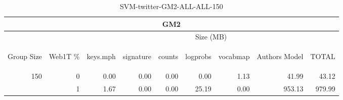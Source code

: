 \begin{center}
\begin{table}[htbp] 
 \begin{center}
\begin{tabular}{ | r | r | r | r | r | r | r | r | r |}
\hline
\multicolumn{9}{|c|}{GM2}\\
\hline
 & & \multicolumn{7}{|c|}{Size (MB)}\\ \cline{3-9}
\begin{sideways}Group Size\end{sideways} & \begin{sideways}Web1T \% \end{sideways} & \begin{sideways}keys.mph\end{sideways} & \begin{sideways}signature\end{sideways} & \begin{sideways}counts\end{sideways} & \begin{sideways}logprobs\end{sideways} & \begin{sideways}vocabmap\end{sideways} & \begin{sideways}Authors Model \end{sideways} & \begin{sideways}TOTAL\end{sideways}\\
\hline
\multirow{1}{*}{150}
 & 0 & 0.00 & 0.00 & 0.00 & 0.00 & 1.13 & 41.99 & 43.12\\ \cline{2-9}
 & 1 & 1.67 & 0.00 & 0.00 & 25.19 & 0.00 & 953.13 & 979.99\\ \cline{2-9}
\hline
\end{tabular}
\caption{SVM-twitter-GM2-ALL-ALL-150}
\label{table:SVM-twitter-GM2-ALL-ALL-150}
\end{center}
 \end{table}
\end{center}

